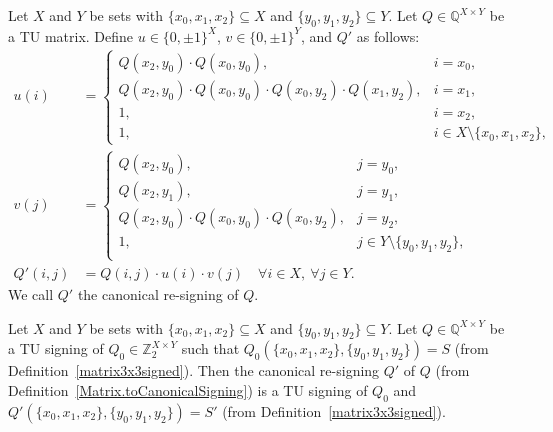 \begin{definition}
    \label{Matrix.toCanonicalSigning}
    \leanok
    Let $X$ and $Y$ be sets with $\{x_{0}, x_{1}, x_{2}\} \subseteq X$ and $\{y_{0}, y_{1}, y_{2}\} \subseteq Y$. Let $Q \in \mathbb{Q}^{X \times Y}$ be a TU matrix. Define $u \in \{0, \pm 1\}^{X}$, $v \in \{0, \pm 1\}^{Y}$, and $Q'$ as follows:
    \begin{align*}
        u(i) &= \begin{cases}
            Q (x_{2}, y_{0}) \cdot Q (x_{0}, y_{0}), & i = x_{0}, \\
            Q (x_{2}, y_{0}) \cdot Q (x_{0}, y_{0}) \cdot Q (x_{0}, y_{2}) \cdot Q (x_{1}, y_{2}), & i = x_{1}, \\
            1, & i = x_{2}, \\
            1, & i \in X \setminus \{x_{0}, x_{1}, x_{2}\},
        \end{cases} \\
        v(j) &= \begin{cases}
            Q (x_{2}, y_{0}), & j = y_{0}, \\
            Q (x_{2}, y_{1}), & j = y_{1}, \\
            Q (x_{2}, y_{0}) \cdot Q (x_{0}, y_{0}) \cdot Q (x_{0}, y_{2}), & j = y_{2}, \\
            1, & j \in Y \setminus \{y_{0}, y_{1}, y_{2}\}, \\
        \end{cases} \\
        Q' (i, j) &= Q (i, j) \cdot u(i) \cdot v(j) \quad \forall i \in X, \ \forall j \in Y.
    \end{align*}
    We call $Q'$ the canonical re-signing of $Q$.
\end{definition}

\begin{lemma}
    \label{Matrix.HasTuCanonicalSigning.toCanonicalSigning}
    \leanok
    Let $X$ and $Y$ be sets with $\{x_{0}, x_{1}, x_{2}\} \subseteq X$ and $\{y_{0}, y_{1}, y_{2}\} \subseteq Y$. Let $Q \in \mathbb{Q}^{X \times Y}$ be a TU signing of $Q_{0} \in \mathbb{Z}_{2}^{X \times Y}$ such that $Q_{0} (\{x_{0}, x_{1}, x_{2}\}, \{y_{0}, y_{1}, y_{2}\}) = S$ (from Definition~\ref{matrix3x3signed}). Then the canonical re-signing $Q'$ of $Q$ (from Definition~\ref{Matrix.toCanonicalSigning}) is a TU signing of $Q_{0}$ and $Q' (\{x_{0}, x_{1}, x_{2}\}, \{y_{0}, y_{1}, y_{2}\}) = S'$ (from Definition~\ref{matrix3x3signed}).
\end{lemma}

